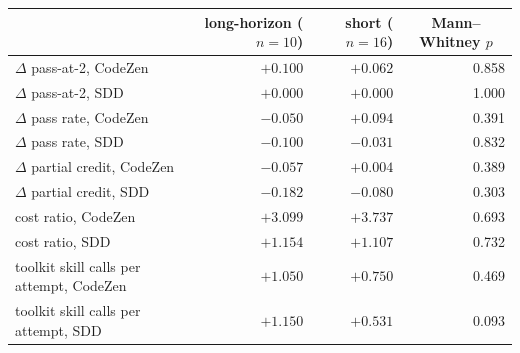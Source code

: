
\begin{tabular}{@{}lrrr@{}}
\toprule
 & long-horizon ($n = 10$) & short ($n = 16$) & \multicolumn{1}{c}{Mann--Whitney $p$} \\
\midrule
$\Delta$ pass-at-2, CodeZen & $+0.100$ & $+0.062$ & 0.858 \\
$\Delta$ pass-at-2, SDD & $+0.000$ & $+0.000$ & 1.000 \\
$\Delta$ pass rate, CodeZen & $-0.050$ & $+0.094$ & 0.391 \\
$\Delta$ pass rate, SDD & $-0.100$ & $-0.031$ & 0.832 \\
$\Delta$ partial credit, CodeZen & $-0.057$ & $+0.004$ & 0.389 \\
$\Delta$ partial credit, SDD & $-0.182$ & $-0.080$ & 0.303 \\
cost ratio, CodeZen & $+3.099$ & $+3.737$ & 0.693 \\
cost ratio, SDD & $+1.154$ & $+1.107$ & 0.732 \\
toolkit skill calls per attempt, CodeZen & $+1.050$ & $+0.750$ & 0.469 \\
toolkit skill calls per attempt, SDD & $+1.150$ & $+0.531$ & 0.093 \\
\bottomrule
\end{tabular}
